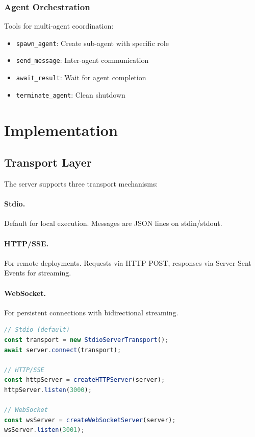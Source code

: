 \documentclass[11pt,twocolumn]{article}
\begin{document}
\subsubsection{Agent Orchestration}

Tools for multi-agent coordination:
\begin{itemize}
    \item \texttt{spawn\_agent}: Create sub-agent with specific role
    \item \texttt{send\_message}: Inter-agent communication
    \item \texttt{await\_result}: Wait for agent completion
    \item \texttt{terminate\_agent}: Clean shutdown
\end{itemize}

\section{Implementation}

\subsection{Transport Layer}

The server supports three transport mechanisms:

\paragraph{Stdio.} Default for local execution. Messages are JSON lines on stdin/stdout.

\paragraph{HTTP/SSE.} For remote deployments. Requests via HTTP POST, responses via Server-Sent Events for streaming.

\paragraph{WebSocket.} For persistent connections with bidirectional streaming.

\begin{lstlisting}[language=TypeScript]
// Stdio (default)
const transport = new StdioServerTransport();
await server.connect(transport);

// HTTP/SSE
const httpServer = createHTTPServer(server);
httpServer.listen(3000);

// WebSocket
const wsServer = createWebSocketServer(server);
wsServer.listen(3001);
\end{lstlisting}
\end{document}

